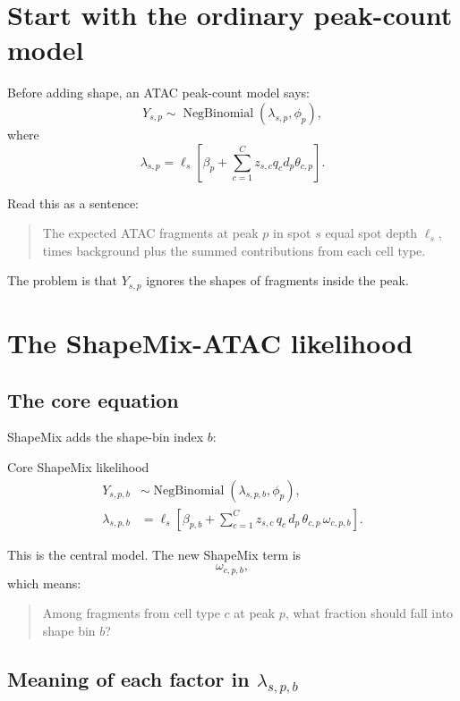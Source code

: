\documentclass[11pt]{article}
\newcommand{\NB}{\operatorname{NegBinomial}}
\begin{document}
\section{Start with the ordinary peak-count model}

Before adding shape, an ATAC peak-count model says:
\[
Y_{s,p} \sim \NB(\lambda_{s,p},\phi_p),
\]
where
\[
\lambda_{s,p}
= \ell_s\left[\beta_p + \sum_{c=1}^C z_{s,c} q_c d_p \theta_{c,p}\right].
\]

Read this as a sentence:

\begin{quote}
The expected ATAC fragments at peak \(p\) in spot \(s\) equal spot depth \(\ell_s\), times background plus the summed contributions from each cell type.
\end{quote}

The problem is that \(Y_{s,p}\) ignores the shapes of fragments inside the peak.

\section{The ShapeMix-ATAC likelihood}

\subsection{The core equation}

ShapeMix adds the shape-bin index \(b\):

\begin{mathbox}{Core ShapeMix likelihood}
\begin{align}
Y_{s,p,b} &\sim \NB(\lambda_{s,p,b},\phi_p), \label{eq:likelihood}\\[0.3em]
\lambda_{s,p,b}
&= \ell_s\left[\beta_{p,b} + \sum_{c=1}^{C} z_{s,c}\,q_c\,d_p\,\theta_{c,p}\,\omega_{c,p,b}\right]. \label{eq:lambda}
\end{align}
\end{mathbox}

This is the central model.  The new ShapeMix term is
\[
\boxed{\omega_{c,p,b}},
\]
which means:

\begin{quote}
Among fragments from cell type \(c\) at peak \(p\), what fraction should fall into shape bin \(b\)?
\end{quote}

\subsection{Meaning of each factor in \texorpdfstring{\(\lambda_{s,p,b}\)}{lambda}}
\end{document}
